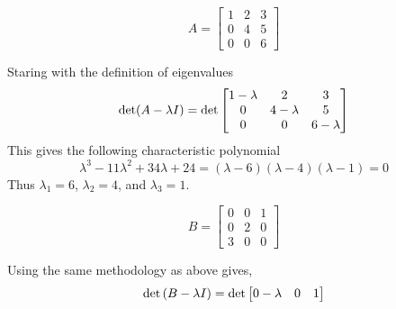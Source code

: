 \begin{enumerate}[label=\arabic*.]
        \begin{equation}
            A =
            \begin{bmatrix}
                1 & 2 & 3 \\ 
                0 & 4 & 5 \\
                0 & 0 & 6
            \end{bmatrix}
        \end{equation}
        \begin{mdframed}[style=MyFrame]
            Staring with the definition of eigenvalues
            \begin{equation}
                \text{det}(A-\lambda I) =
                \text{det}
                \begin{bmatrix}
                    1-\lambda     &   2           &   3           \\ 
                    0             &   4-\lambda   &   5           \\
                    0             &   0           & 6-\lambda
                \end{bmatrix}
            \end{equation}
            This gives the following characteristic polynomial
            \begin{equation}
                \lambda^{3}-11\lambda^{2}+34\lambda+24
                =
                \left(\lambda-6\right)
                \left(\lambda-4\right)
                \left(\lambda-1\right)
                = 0
            \end{equation}
            Thus $\lambda_{1} = 6$, $\lambda_{2} = 4$, and $\lambda_{3}
            =1$. 
        \end{mdframed}
        \begin{equation}
            B =
            \begin{bmatrix}
                0 & 0 & 1 \\ 
                0 & 2 & 0 \\
                3 & 0 & 0
            \end{bmatrix}
        \end{equation}
        \begin{mdframed}[style=MyFrame]
            Using the same methodology as above gives,
            \begin{equation}
                \text{det} \left(B - \lambda I\right) 
                =
                \text{det}
                \begin{bmatrix}
                    0-\lambda   &   0           & 1             \\ 

\end{bmatrix}
\end{equation}
\end{mdframed}
\end{enumerate}
